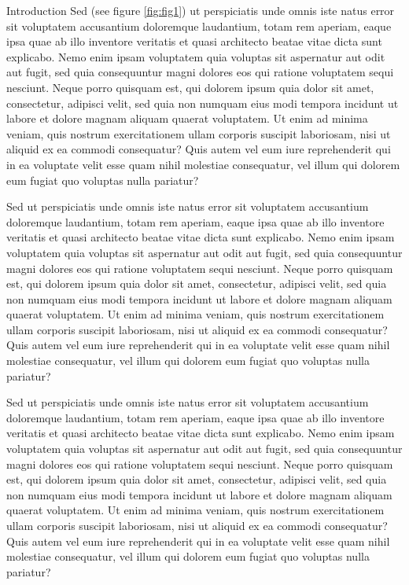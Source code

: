 \documentclass[french, english]{mythesis}
\begin{document}
\begin{mychapter+}{Introduction}
	Sed (see figure \ref{fig:fig1}) ut perspiciatis unde omnis iste natus error sit voluptatem accusantium doloremque laudantium, totam rem aperiam, eaque ipsa quae ab illo inventore veritatis et quasi architecto beatae vitae dicta sunt explicabo. Nemo enim ipsam voluptatem quia voluptas sit aspernatur aut odit aut fugit, sed quia consequuntur magni dolores eos qui ratione voluptatem sequi nesciunt. Neque porro quisquam est, qui dolorem ipsum quia dolor sit amet, consectetur, adipisci velit, sed quia non numquam eius modi tempora incidunt ut labore et dolore magnam aliquam quaerat voluptatem. Ut enim ad minima veniam, quis nostrum exercitationem ullam corporis suscipit laboriosam, nisi ut aliquid ex ea commodi consequatur? Quis autem vel eum iure reprehenderit qui in ea voluptate velit esse quam nihil molestiae consequatur, vel illum qui dolorem eum fugiat quo voluptas nulla pariatur?
	
	Sed ut perspiciatis unde omnis iste natus error sit voluptatem accusantium doloremque laudantium, totam rem aperiam, eaque ipsa quae ab illo inventore veritatis et quasi architecto beatae vitae dicta sunt explicabo. Nemo enim ipsam voluptatem quia voluptas sit aspernatur aut odit aut fugit, sed quia consequuntur magni dolores eos qui ratione voluptatem sequi nesciunt. Neque porro quisquam est, qui dolorem ipsum quia dolor sit amet, consectetur, adipisci velit, sed quia non numquam eius modi tempora incidunt ut labore et dolore magnam aliquam quaerat voluptatem. Ut enim ad minima veniam, quis nostrum exercitationem ullam corporis suscipit laboriosam, nisi ut aliquid ex ea commodi consequatur? Quis autem vel eum iure reprehenderit qui in ea voluptate velit esse quam nihil molestiae consequatur, vel illum qui dolorem eum fugiat quo voluptas nulla pariatur?

	Sed ut perspiciatis unde omnis iste natus error sit voluptatem accusantium doloremque laudantium, totam rem aperiam, eaque ipsa quae ab illo inventore veritatis et quasi architecto beatae vitae dicta sunt explicabo. Nemo enim ipsam voluptatem quia voluptas sit aspernatur aut odit aut fugit, sed quia consequuntur magni dolores eos qui ratione voluptatem sequi nesciunt. Neque porro quisquam est, qui dolorem ipsum quia dolor sit amet, consectetur, adipisci velit, sed quia non numquam eius modi tempora incidunt ut labore et dolore magnam aliquam quaerat voluptatem. Ut enim ad minima veniam, quis nostrum exercitationem ullam corporis suscipit laboriosam, nisi ut aliquid ex ea commodi consequatur? Quis autem vel eum iure reprehenderit qui in ea voluptate velit esse quam nihil molestiae consequatur, vel illum qui dolorem eum fugiat quo voluptas nulla pariatur?
	\end{mychapter+}
\end{document}
